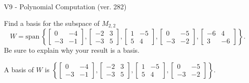 \begin{exercise}
  \begin{exerciseTitle}V9 - Polynomial Computation (ver. 282)\end{exerciseTitle}
  \begin{exerciseStatement}
    Find a basis for the subspace of \(M_{2,2}\) 
\[W=\mathrm{span}\ \left\{\left[\begin{array}{cc}
0 & -4 \\
-3 & -1
\end{array}\right] , \left[\begin{array}{cc}
-2 & 3 \\
-3 & 5
\end{array}\right] , \left[\begin{array}{cc}
1 & -5 \\
5 & 4
\end{array}\right] , \left[\begin{array}{cc}
0 & -5 \\
-3 & -2
\end{array}\right] , \left[\begin{array}{cc}
-6 & 4 \\
3 & -6
\end{array}\right]\right\}.\]
 Be sure to explain why your result is a basis.


  \end{exerciseStatement}
  \begin{exerciseAnswer}
   A basis of \(W\) is  \(\left\{\left[\begin{array}{cc}
0 & -4 \\
-3 & -1
\end{array}\right] , \left[\begin{array}{cc}
-2 & 3 \\
-3 & 5
\end{array}\right] , \left[\begin{array}{cc}
1 & -5 \\
5 & 4
\end{array}\right] , \left[\begin{array}{cc}
0 & -5 \\
-3 & -2
\end{array}\right]\right\}\).
  


  \end{exerciseAnswer}
\end{exercise}